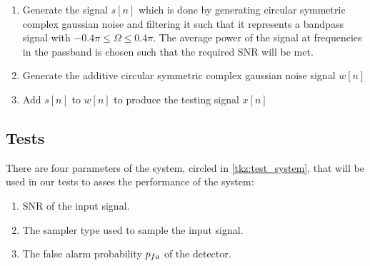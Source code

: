 \documentclass[a4paper, openany, oneside]{memoir}
\begin{document}
\begin{enumerate}
	\item Generate the signal $s[n]$ which is done by generating circular symmetric complex gaussian noise and filtering it such that it represents a bandpass signal with $-0.4\pi \leq \Omega \leq 0.4\pi$. The average power of the signal at frequencies in the passband is chosen such
	that the required SNR will be met. 
	\item Generate the additive circular symmetric complex gaussian noise signal $w[n]$ 
	\item Add $s[n]$ to $w[n]$ to produce the testing signal $x[n]$
\end{enumerate}



\subsection{Tests}
There are four parameters of the system, circled in \cref{tkz:test_system}, that will be used in our tests to asses the performance of the system:
\begin{enumerate}
	\item SNR of the input signal.
	\item The sampler type used to sample the input signal.
	\item The false alarm probability $p\ss{fa}$ of the detector.
\end{enumerate}
\end{document}
